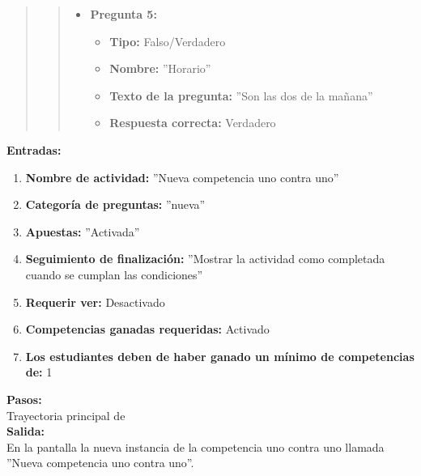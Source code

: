 \begin{quote}
\begin{quote}
\begin{itemize}
                \item \textbf{Pregunta 5:}
                \begin{itemize}
                  \item \textbf{Tipo:} Falso/Verdadero
                  \item \textbf{Nombre:} ''Horario''
                  \item \textbf{Texto de la pregunta:} ''Son las dos de la mañana''
                  \item \textbf{Respuesta correcta:} Verdadero
                \end{itemize}

            \end{itemize}
    \end{quote}


\end{quote}

    \textbf{Entradas:}\\
    \begin{enumerate}
        \item \textbf{Nombre de actividad:} ''Nueva competencia uno contra uno''
        \item \textbf{Categoría de preguntas:} ''nueva''
        \item \textbf{Apuestas:} ''Activada''
        \item \textbf{Seguimiento de finalización:} ''Mostrar la actividad como completada cuando se cumplan las condiciones''
        \item \textbf{Requerir ver:} Desactivado
        \item \textbf{Competencias ganadas requeridas:} Activado
        \item \textbf{Los estudiantes deben de haber ganado un mínimo de competencias de:} 1
    \end{enumerate}
    \textbf{Pasos:}\\

    Trayectoria principal de \\

    \textbf{Salida:}\\

     En la pantalla  la nueva instancia de la competencia uno contra uno llamada ''Nueva competencia uno contra uno''.
